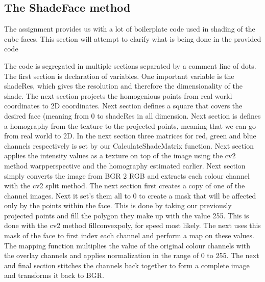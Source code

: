 \subsection{The ShadeFace method}

The assignment provides us with a lot of boilerplate code used in shading of
the cube faces. This section will attempt to clarify what is being done in the
provided code

The code is segregated in multiple sections separated by a comment line of dots.
The first section is declaration of variables. One important variable is the
shadeRes, which gives the resolution and therefore the dimensionality of the
shade. The next section projects the homogenious points from real world
coordinates to 2D coordinates. Next section defines a square that covers the
desired face (meaning from 0 to shadeRes in all dimension. Next section is
defines a homography from the texture to the projected points, meaning that
we can go from real world to 2D. In the next section three matrices for red,
green and blue channels respectively is set by our CalculateShadeMatrix
function. Next section applies the intensity values as a texture on top of the
image using the cv2 method warpperspective and the homography estimated
earlier. Next section simply converts the image from BGR 2 RGB and
extracts each colour channel with the cv2 split method. The next section first
creates a copy of one of the channel images. Next it set's them all to 0 to
create a mask that will be affected only by the points within the face. This
is done by taking our previously projected points and fill the polygon they
make up with the value 255. This is done with the cv2 method
fillconvexpoly, for speed most likely. The next uses this mask of the face to
first index each channel and perform a map on these values. The mapping
function multiplies the value of the original colour channels with the
overlay channels and applies normalization in the range of 0 to 255. The next
and final section stitches the channels back together to form a complete image
and transforms it back to BGR.
